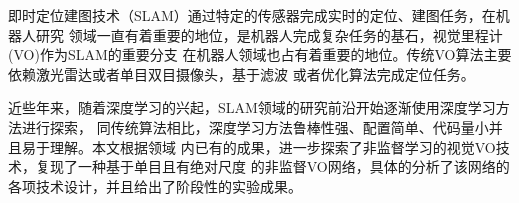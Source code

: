 
\begin{cabstract}

  即时定位建图技术（SLAM）通过特定的传感器完成实时的定位、建图任务，在机器人研究
  领域一直有着重要的地位，是机器人完成复杂任务的基石，视觉里程计(VO)作为SLAM的重要分支
  在机器人领域也占有着重要的地位。传统VO算法主要依赖激光雷达或者单目双目摄像头，基于滤波
  或者优化算法完成定位任务。
  
  近些年来，随着深度学习的兴起，SLAM领域的研究前沿开始逐渐使用深度学习方法进行探索，
  同传统算法相比，深度学习方法鲁棒性强、配置简单、代码量小并且易于理解。本文根据领域
  内已有的成果，进一步探索了非监督学习的视觉VO技术，复现了一种基于单目且有绝对尺度
  的非监督VO网络，具体的分析了该网络的各项技术设计，并且给出了阶段性的实验成果。

\end{cabstract}

